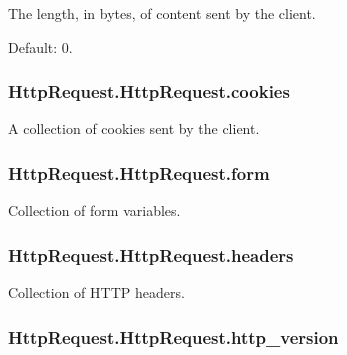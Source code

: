 The length, in bytes, of content sent by the client. 

Default\-: 0. \hypertarget{class_http_request_1_1_http_request_a64b3bf1ae5347ad8570527ec6c390897}{
\subsubsection[{cookies}]{\setlength{\rightskip}{0pt plus 5cm}Http\-Request.\-Http\-Request.\-cookies}}\label{class_http_request_1_1_http_request_a64b3bf1ae5347ad8570527ec6c390897}


A collection of cookies sent by the client. 

\hypertarget{class_http_request_1_1_http_request_a7e77838e0ad5a1dbc61cc2a5eba94fad}{
\subsubsection[{form}]{\setlength{\rightskip}{0pt plus 5cm}Http\-Request.\-Http\-Request.\-form}}\label{class_http_request_1_1_http_request_a7e77838e0ad5a1dbc61cc2a5eba94fad}


Collection of form variables. 

\hypertarget{class_http_request_1_1_http_request_ab06f3b22757af971c0958d6d73028c11}{
\subsubsection[{headers}]{\setlength{\rightskip}{0pt plus 5cm}Http\-Request.\-Http\-Request.\-headers}}\label{class_http_request_1_1_http_request_ab06f3b22757af971c0958d6d73028c11}


Collection of H\-T\-T\-P headers. 

\hypertarget{class_http_request_1_1_http_request_a2da4b4052451f35694c6f4fe6572c0be}{
\subsubsection[{http\-\_\-version}]{\setlength{\rightskip}{0pt plus 5cm}Http\-Request.\-Http\-Request.\-http\-\_\-version}}\label{class_http_request_1_1_http_request_a2da4b4052451f35694c6f4fe6572c0be}


